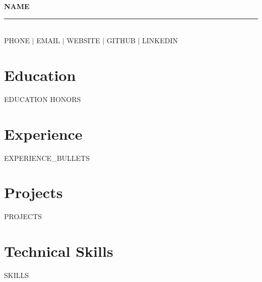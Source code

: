 \documentclass[{{FONT_SIZE}}pt,letterpaper]{extarticle}
\begin{document}
\begin{center}
  {\huge \textbf{{{NAME}}}} \\[2pt]
  {\color{accent}\rule{0.9\linewidth}{1pt}} \\[{{HEADER_SKIP}}]
  {{PHONE}} $|$ {{EMAIL}} $|$ {{WEBSITE}} $|$ {{GITHUB}} $|$ {{LINKEDIN}}
\end{center}

\section{Education}
{{EDUCATION}}
{{HONORS}}

\section{Experience}
{{EXPERIENCE_BULLETS}}

\section{Projects}
{{PROJECTS}}

\section{Technical Skills}
{{SKILLS}}
\end{document}
